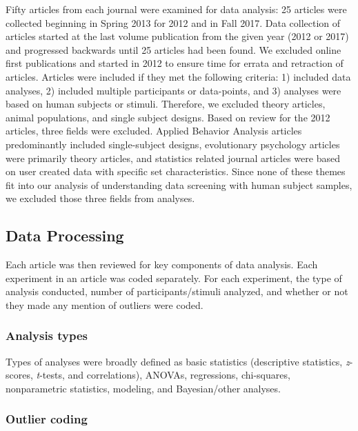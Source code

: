 \documentclass[english,man]{apa6}
\theoremstyle{definition}
\theoremstyle{definition}
\theoremstyle{definition}
\theoremstyle{remark}
\begin{document}
Fifty articles from each journal were examined for data analysis: 25
articles were collected beginning in Spring 2013 for 2012 and in Fall
2017. Data collection of articles started at the last volume publication
from the given year (2012 or 2017) and progressed backwards until 25
articles had been found. We excluded online first publications and
started in 2012 to ensure time for errata and retraction of articles.
Articles were included if they met the following criteria: 1) included
data analyses, 2) included multiple participants or data-points, and 3)
analyses were based on human subjects or stimuli. Therefore, we excluded
theory articles, animal populations, and single subject designs. Based
on review for the 2012 articles, three fields were excluded. Applied
Behavior Analysis articles predominantly included single-subject
designs, evolutionary psychology articles were primarily theory
articles, and statistics related journal articles were based on user
created data with specific set characteristics. Since none of these
themes fit into our analysis of understanding data screening with human
subject samples, we excluded those three fields from analyses.

\subsection{Data Processing}\label{data-processing}

Each article was then reviewed for key components of data analysis. Each
experiment in an article was coded separately. For each experiment, the
type of analysis conducted, number of participants/stimuli analyzed, and
whether or not they made any mention of outliers were coded.

\subsubsection{Analysis types}\label{analysis-types}

Types of analyses were broadly defined as basic statistics (descriptive
statistics, \emph{z}-scores, \emph{t}-tests, and correlations), ANOVAs,
regressions, chi-squares, nonparametric statistics, modeling, and
Bayesian/other analyses.

\subsubsection{Outlier coding}\label{outlier-coding}
\end{document}
